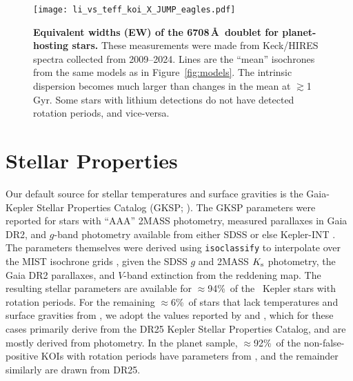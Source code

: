 \documentclass[11pt,twocolumn,tighten]{aastex63}
\newcommand{\fracstarswithprotwithbtwenty}{{$\approx$94\%}}
\newcommand{\fracstarswithprotwithoutbtwenty}{{$\approx$6\%}}
\newcommand{\frackoisnofpwithprotwithbtwenty}{{$\approx$92\%}}
\begin{document}
\begin{figure}[!t]
	\begin{center}
		\leavevmode
		\texttt{[image: li\_vs\_teff\_koi\_X\_JUMP\_eagles.pdf]}
	\end{center}
	\vspace{-0.5cm}
	\caption{
    {\bf Equivalent widths (EW) of the  6708\,\AA\ doublet
    for planet-hosting stars.} These measurements were made from
    Keck/HIRES spectra collected from 2009--2024.  Lines are the ``mean''
    isochrones from the same models as in Figure~\ref{fig:models}.  The
    intrinsic dispersion becomes much larger
    than changes in the mean at $\gtrsim$1\,Gyr.  Some stars with lithium detections do
    not have detected rotation periods, and vice-versa.
		\label{fig:li_vs_teff}
	}
\end{figure}



\section{Stellar Properties}
\label{sec:stellarprops}




Our default source for stellar temperatures and surface gravities is
the Gaia-Kepler Stellar Properties Catalog (GKSP;
\citealt{Berger_2020a_catalog}).  The GKSP parameters were reported
for stars with ``AAA'' 2MASS photometry, measured parallaxes in Gaia
DR2,  and $g$-band photometry available from either SDSS or else Kepler-INT
\citep{2012AJ....144...24G}.  The parameters themselves were derived using
\texttt{isoclassify} \citep{2017ApJ...844..102H} to interpolate over
the MIST isochrone grids \citep{Choi_2016,2016ApJS..222....8D}, given
the SDSS $g$ and 2MASS $K_{\rm s}$ photometry, the Gaia DR2
parallaxes, and $V$-band extinction from the
\citet{2019ApJ...887...93G} reddening map.  The resulting stellar
parameters are available for \fracstarswithprotwithbtwenty\ of the
\nuniqstarsantosrot\ Kepler stars with rotation periods.  For the
remaining \fracstarswithprotwithoutbtwenty\ of stars that lack
temperatures and surface gravities from
, we adopt the values reported by
\citet{Santos_2019} and \citet{Santos_2021}, which for these cases
primarily derive from the \citet{Mathur_2017} DR25 Kepler Stellar
Properties Catalog, and are mostly derived from photometry.  In the
planet sample, \frackoisnofpwithprotwithbtwenty\ of the
non-false-positive KOIs with rotation periods have parameters from
\citet{Berger_2020a_catalog}, and the remainder similarly are drawn
from DR25. 
\end{document}
